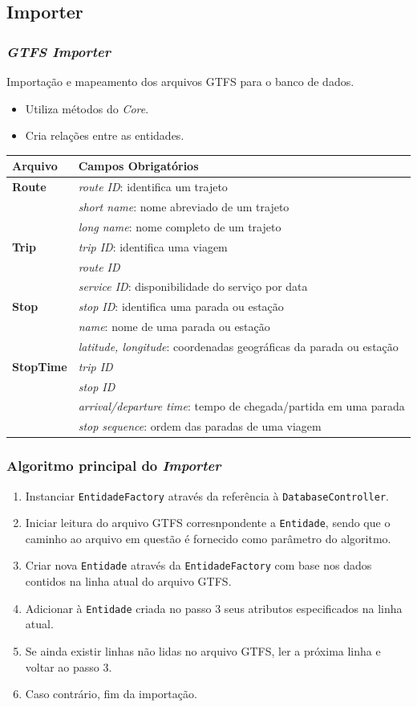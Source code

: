 \subsection{Importer}
\frame
{
\frametitle{\emph{GTFS Importer}}
Importação e mapeamento dos arquivos GTFS para o banco de dados.
\begin{itemize}
\item Utiliza métodos do \emph{Core}.
\item Cria relações entre as entidades.
\end{itemize}


\begin{center}
	\scriptsize
	\begin{tabular}{ll}
		\hline
		\textbf{Arquivo} & \textbf{Campos Obrigatórios} \\
		\hline
		\textbf{Route} & \emph{route ID}: identifica um trajeto \\
				    & \emph{short name}: nome abreviado de um trajeto \\
				    & \emph{long name}: nome completo de um trajeto \\
		\textbf{Trip} & \emph{trip ID}: identifica uma viagem \\ 
				& \emph{route ID} \\ 
				& \emph{service ID}: disponibilidade do serviço por data \\
		\textbf{Stop} & \emph{stop ID}: identifica uma parada ou estação \\
				 & \emph{name}: nome de uma parada ou estação \\
				 & \emph{latitude, longitude}: coordenadas geográficas da parada ou estação \\
		\textbf{StopTime} & \emph{trip ID} \\
				         & \emph{stop ID} \\
				         & \emph{arrival/departure time}: tempo de chegada/partida em uma parada \\
				         & \emph{stop sequence}: ordem das paradas de uma viagem \\
		\hline
	\end{tabular}
\end{center}
}

\frame
{
\frametitle{Algoritmo principal do \emph{Importer}}
\begin{enumerate}
	\item Instanciar \texttt{EntidadeFactory} através da referência à \texttt{DatabaseController}.
	\item Iniciar leitura do arquivo GTFS corresnpondente a \texttt{Entidade}, sendo que o caminho ao arquivo em questão é fornecido como parâmetro do algoritmo.
	\item Criar nova \texttt{Entidade} através da \texttt{EntidadeFactory} com base nos dados contidos na linha atual do arquivo GTFS.
	\item Adicionar à \texttt{Entidade} criada no passo 3 seus atributos especificados na linha atual.
	\item Se ainda existir linhas não lidas no arquivo GTFS, ler a próxima linha e voltar ao passo 3.
	\item Caso contrário, fim da importação.
\end{enumerate}
}

